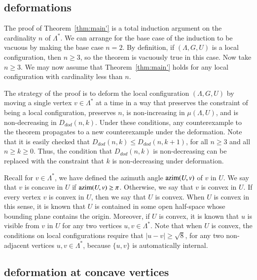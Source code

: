 \subsection{deformations}


The proof of Theorem~\ref{thm:main'} is a total induction argument
on  the cardinality $n$ of $\Lambda^*$.  We can arrange for
the base case of the induction to be vacuous by making the
base case $n=2$. By definition, if $(\Lambda,G,U)$
is a local configuration, then $n\ge 3$, so the theorem is
vacuously true in this case.  Now take $n\ge 3$. We may now assume that
Theorem~\ref{thm:main'} holds for any local configuration with
cardinality less than $n$.  

The strategy of the proof is to deform the local configuration $(\Lambda,G,U)$ by moving a single vertex $v\in\Lambda^*$ at a time in a way
that preserves the constraint of being a local configuration,
preserves $n$, 
is non-increasing in $\mu(\Lambda,U)$, 
and is non-decreasing in $D_{dod}(n,k)$.
Under these conditions, any counterexample to the theorem propagates 
to a new counterexample under the deformation.
Note that it is easily checked that $D_{dod}(n,k) \le D_{dod}(n,k+1)$, for all
$n\ge 3$ and all $n\ge k\ge0$.  Thus, the condition that $D_{dod}(n,k)$
is non-decreasing can be replaced with the constraint that $k$
is non-decreasing under deformation.

Recall for $v\in\Lambda^*$, we have defined the azimuth angle
${\operatorname{azim}}(U,v)$ of $v$ in $U$.  We say that $v$ is concave in $U$
if ${\operatorname{azim}}(U,v)\ge\pi$.  Otherwise, we say that $v$ is convex
in $U$.  If every vertex $v$ is convex in $U$, then we say that $U$
is convex.  When $U$ is convex in this sense, it is known that $U$
is contained in some open half-space whose bounding plane
contains the origin.  Moreover,
if $U$ is convex,
it is known that $u$ is visible from $v$ in $U$
for any two vertices $u,v\in\Lambda^*$.  Note that when $U$ is 
convex, the conditions on local configurations require that
$|u-v|\ge\sqrt8$, for any two non-adjacent vertices $u,v\in\Lambda^*$,
because $\{u,v\}$ is automatically internal.

\subsection{deformation at concave vertices}

